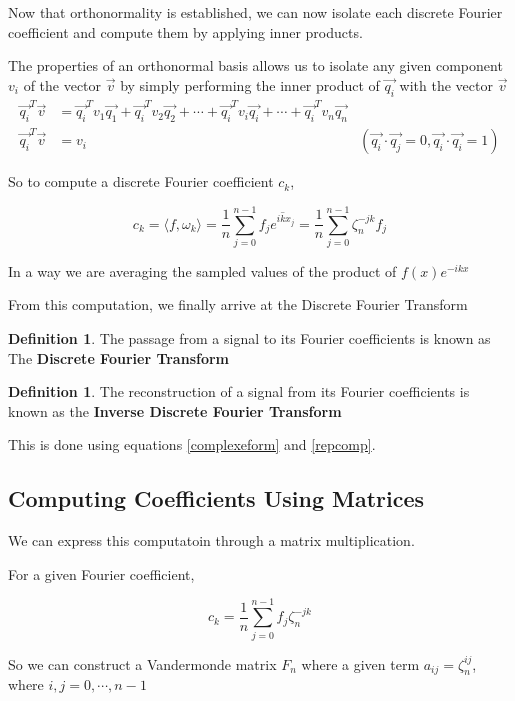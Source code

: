 \documentclass[11pt]{amsart}
\theoremstyle{definition}
\newtheorem{defn}[thm]{Definition}
\theoremstyle{remark}
\numberwithin{equation}{section}
\begin{document}
Now that orthonormality is established, we can now isolate each discrete Fourier coefficient and compute them by applying inner products.

The properties of an orthonormal basis allows us to isolate any given component $v_i$ of the vector $\vec{v}$ by simply performing the inner product of $\vec{q_i}$ with the vector $\vec{v}$
\begin{align*}
	\vec{q_i}^T\vec{v} &= \vec{q_i}^T v_1 \vec{q_1} + \vec{q_i}^T v_2 \vec{q_2} + \cdots + \vec{q_i}^T v_i \vec{q_i} + \cdots + \vec{q_i}^T v_n \vec{q_n} \\
	\vec{q_i}^T \vec{v} &= v_i &(\vec{q_i}\cdot \vec{q_j} = 0, \vec{q_i} \cdot \vec{q_i} = 1)
\end{align*}


So to compute a discrete Fourier coefficient $c_k$,

\[
	c_k = \langle f, \omega_k \rangle = \frac{1}{n} \sum_{j=0}^{n-1} f_j \overline{e^{ikx_j}} = \frac{1}{n} \sum_{j=0}^{n-1} \zeta_n^{-jk} f_j
\]

In a way we are averaging the sampled values of the product of $f(x) e^{-ikx}$

From this computation, we finally arrive at the Discrete Fourier Transform

\begin{defn}
The passage from a signal to its Fourier coefficients is known as The \textbf{Discrete Fourier Transform}
\end{defn}


\begin{defn}
The reconstruction of a signal from its Fourier coefficients is known as the \textbf{Inverse Discrete Fourier Transform}
\end{defn}

This is done using equations \ref{complexeform} and \ref{repcomp}.
\subsection{Computing Coefficients Using Matrices }
We can express this computatoin through a matrix multiplication.

For a given Fourier coefficient,

\[
	{c}_k = \frac{1}{n}\sum_{j=0}^{n-1} f_j \zeta_n^{-jk}
\]

So we can construct a Vandermonde matrix $F_n$ where a given term $a_{ij} = \zeta_n^{ij}$, where $i,j = 0, \cdots, {n-1}$
\end{document}
